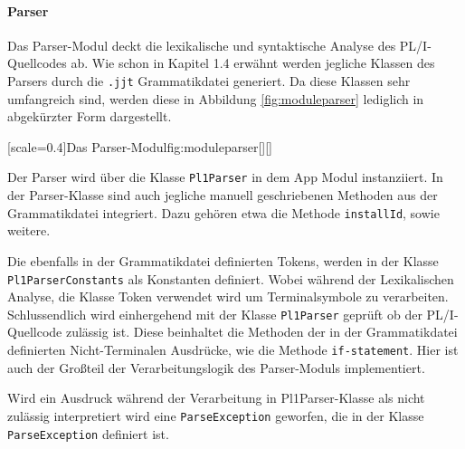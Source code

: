 
\paragraph{Parser}
Das Parser-Modul deckt die lexikalische und syntaktische Analyse des PL/I-Quellcodes ab.
Wie schon in Kapitel 1.4 erwähnt werden jegliche Klassen des Parsers durch die \verb+.jjt+ Grammatikdatei generiert. Da diese Klassen sehr umfangreich sind, werden diese in Abbildung \ref{fig:moduleparser} lediglich in abgekürzter Form dargestellt. 

[scale=0.4]{Das Parser-Modul}{fig:moduleparser}[][]
\pagebreak

Der Parser wird über die Klasse \verb+Pl1Parser+ in dem App Modul instanziiert. In der Parser-Klasse sind auch jegliche manuell geschriebenen Methoden aus der Grammatikdatei integriert. 
Dazu gehören etwa die Methode \verb+installId+, sowie weitere. 

Die ebenfalls in der Grammatikdatei definierten Tokens, 
werden in der Klasse \verb+Pl1ParserConstants+ als Konstanten definiert. 
Wobei während der Lexikalischen Analyse, die Klasse Token verwendet wird um Terminalsymbole zu verarbeiten. 
Schlussendlich wird einhergehend mit der Klasse \verb+Pl1Parser+ geprüft ob der PL/I-Quellcode zulässig ist. 
Diese beinhaltet die Methoden der in der Grammatikdatei definierten Nicht-Terminalen Ausdrücke, wie die Methode \verb+if-statement+. 
Hier ist auch der Großteil der Verarbeitungslogik des Parser-Moduls implementiert.

Wird ein Ausdruck während der Verarbeitung in Pl1Parser-Klasse als nicht zulässig  interpretiert wird eine \verb+ParseException+ geworfen, die in der Klasse \verb+ParseException+ definiert ist.

